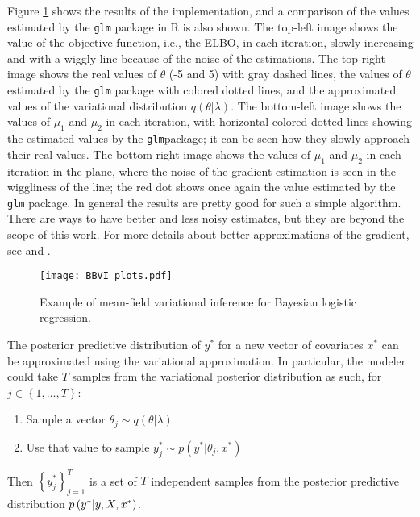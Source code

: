 Figure \ref{fig:BBVI_plots} shows the results of the implementation, and a comparison of the values estimated by the \texttt{glm} package in R is also shown. The top-left image shows the value of the objective function, i.e., the ELBO, in each iteration, slowly increasing and with a wiggly line because of the noise of the estimations. The top-right image shows the real values of $\theta$ (-5 and 5) with gray dashed lines, the values of $\theta$ estimated by the \texttt{glm} package with colored dotted lines, and the approximated values of the variational distribution $q(\theta | \lambda)$. The bottom-left image shows the values of $\mu_1$ and $\mu_2$ in each iteration, with horizontal colored dotted lines showing the estimated values by the \texttt{glm}package; it can be seen how they slowly approach their real values. The bottom-right image shows the values of $\mu_1$ and $\mu_2$ in each iteration in the plane, where the noise of the gradient estimation is seen in the wiggliness of the line; the red dot shows once again the value estimated by the \texttt{glm} package. In general the results are pretty good for such a simple algorithm. There are ways to have better and less noisy estimates, but they are beyond the scope of this work. For more details about better approximations of the gradient, see \cite{kucukelbir2017automatic} and \cite{ranganath2014black}.

\begin{figure}[H]
    \centering
    \texttt{[image: BBVI\_plots.pdf]}
    \caption{Example of mean-field variational inference for Bayesian logistic regression.}
    \label{fig:BBVI_plots}
\end{figure}

The posterior predictive distribution of $y^*$ for a new vector of covariates $x^*$ can be approximated using the variational approximation. In particular, the modeler could take $T$ samples from the variational posterior distribution as such, for $j \in \left\{ 1, \ldots, T \right\}$:
\begin{enumerate}
  \item Sample a vector $\theta_j \sim q(\theta | \lambda)$
  \item Use that value to sample $y_j^* \sim p(y^* | \theta_j, x^*)$
\end{enumerate}

Then $\left\{ y_j^* \right\}_{j = 1}^T$ is a set of $T$ independent samples from the posterior predictive distribution $p\left( y^* | y, X, x^* \right)$.
